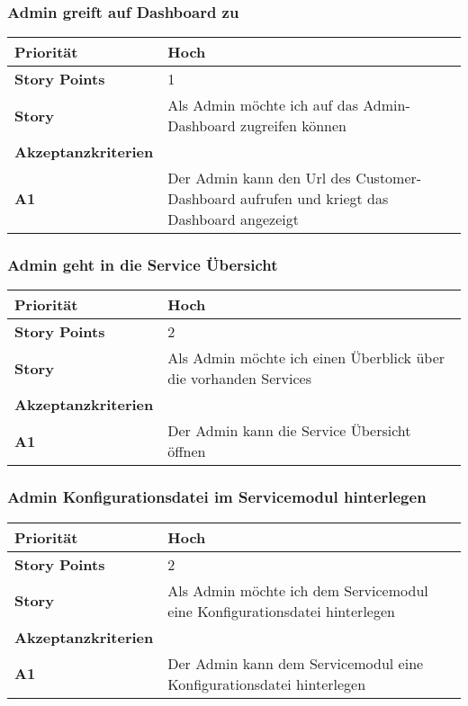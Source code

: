  \subsubsection{Admin greift auf Dashboard zu}
\begin{tabularx}{\linewidth}{l X}
  \textbf{Priorität} & Hoch\\
  \hline
  \textbf{Story Points} & 1\\
  \hline
  \textbf{Story}& Als Admin möchte ich auf das Admin-Dashboard zugreifen können\\
  \hline
    \textbf{Akzeptanzkriterien} & \\
    \hline
  \textbf{A1} & Der Admin kann den Url des Customer-Dashboard aufrufen und 
  kriegt das Dashboard angezeigt\\
  \hline
 \end{tabularx}
 
 \subsubsection{Admin geht in die Service Übersicht}
 
    \begin{tabularx}{\linewidth}{l X}
  \textbf{Priorität} & Hoch\\
  \hline
  \textbf{Story Points} & 2\\
  \hline
  \textbf{Story}& Als Admin möchte ich einen Überblick über die vorhanden Services\\
  \hline
    \textbf{Akzeptanzkriterien} & \\
    \hline
      \textbf{A1} & Der Admin kann die Service Übersicht öffnen\\
  \hline
 \end{tabularx}


 \subsubsection{Admin Konfigurationsdatei im Servicemodul hinterlegen}
     \begin{tabularx}{\linewidth}{l X}
  \textbf{Priorität} & Hoch\\
  \hline
  \textbf{Story Points} & 2\\
  \hline
  \textbf{Story}& Als Admin möchte ich dem Servicemodul eine Konfigurationsdatei hinterlegen\\
  \hline
    \textbf{Akzeptanzkriterien} & \\
    \hline
      \textbf{A1} & Der Admin kann dem Servicemodul eine Konfigurationsdatei hinterlegen\\
  \hline
 \end{tabularx}
 


